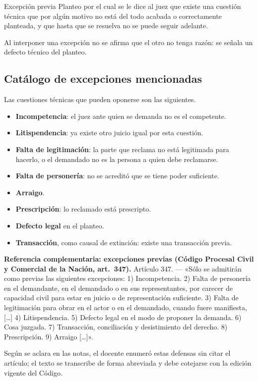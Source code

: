 \documentclass[12pt,oneside]{book}
\begin{document}
\begin{definition}{Excepción previa}
Planteo por el cual se le dice al juez que existe una cuestión técnica que por algún motivo no está del todo acabada o correctamente planteada, y que hasta que se resuelva no se puede seguir adelante.
\end{definition}

Al interponer una excepción no se afirma que el otro no tenga razón: se señala un defecto técnico del planteo.

\subsection{Catálogo de excepciones mencionadas}

Las cuestiones técnicas que pueden oponerse son las siguientes.

\begin{itemize}
    \item \textbf{Incompetencia}: el juez ante quien se demanda no es el competente.
    \item \textbf{Litispendencia}: ya existe otro juicio igual por esta cuestión.
    \item \textbf{Falta de legitimación}: la parte que reclama no está legitimada para hacerlo, o el demandado no es la persona a quien debe reclamarse.
    \item \textbf{Falta de personería}: no se acreditó que se tiene poder suficiente.
    \item \textbf{Arraigo}.
    \item \textbf{Prescripción}: lo reclamado está prescripto.
    \item \textbf{Defecto legal} en el planteo.
    \item \textbf{Transacción}, como causal de extinción: existe una transacción previa.
\end{itemize}

\begin{note}
\textbf{Referencia complementaria: excepciones previas (Código Procesal Civil y Comercial de la Nación, art.~347).}
Artículo 347. --- «Sólo se admitirán como previas las siguientes excepciones: 1) Incompetencia. 2) Falta de personería en el demandante, en el demandado o en sus representantes, por carecer de capacidad civil para estar en juicio o de representación suficiente. 3) Falta de legitimación para obrar en el actor o en el demandado, cuando fuere manifiesta, [\ldots] 4) Litispendencia. 5) Defecto legal en el modo de proponer la demanda. 6) Cosa juzgada. 7) Transacción, conciliación y desistimiento del derecho. 8) Prescripción. 9) Arraigo [\ldots]».

Según se aclara en las notas, el docente enumeró estas defensas sin citar el artículo; el texto se transcribe de forma abreviada y debe cotejarse con la edición vigente del Código.
\end{note}
\end{document}
